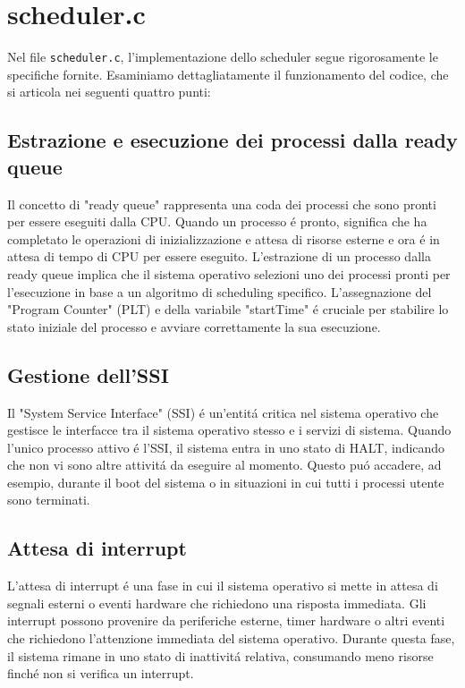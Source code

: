 \documentclass[a4paper]{article}
\begin{document}
\section{scheduler.c}
Nel file \texttt{scheduler.c}, l'implementazione dello scheduler segue rigorosamente le specifiche fornite. Esaminiamo dettagliatamente il funzionamento del codice, che si articola nei seguenti quattro punti:

\subsection{Estrazione e esecuzione dei processi dalla ready queue}
Il concetto di "ready queue" rappresenta una coda dei processi che sono pronti per essere eseguiti dalla CPU. Quando un processo \'e pronto, significa che ha completato le operazioni di inizializzazione e attesa di risorse esterne e ora \'e in attesa di tempo di CPU per essere eseguito. L'estrazione di un processo dalla ready queue implica che il sistema operativo selezioni uno dei processi pronti per l'esecuzione in base a un algoritmo di scheduling specifico. L'assegnazione del "Program Counter" (PLT) e della variabile "startTime" \'e cruciale per stabilire lo stato iniziale del processo e avviare correttamente la sua esecuzione.

\subsection{Gestione dell'SSI}
Il "System Service Interface" (SSI) \'e un'entit\'a critica nel sistema operativo che gestisce le interfacce tra il sistema operativo stesso e i servizi di sistema. Quando l'unico processo attivo \'e l'SSI, il sistema entra in uno stato di HALT, indicando che non vi sono altre attivit\'a da eseguire al momento. Questo pu\'o accadere, ad esempio, durante il boot del sistema o in situazioni in cui tutti i processi utente sono terminati.

\subsection{Attesa di interrupt}
L'attesa di interrupt \'e una fase in cui il sistema operativo si mette in attesa di segnali esterni o eventi hardware che richiedono una risposta immediata. Gli interrupt possono provenire da periferiche esterne, timer hardware o altri eventi che richiedono l'attenzione immediata del sistema operativo. Durante questa fase, il sistema rimane in uno stato di inattivit\'a relativa, consumando meno risorse finché non si verifica un interrupt.
\end{document}
